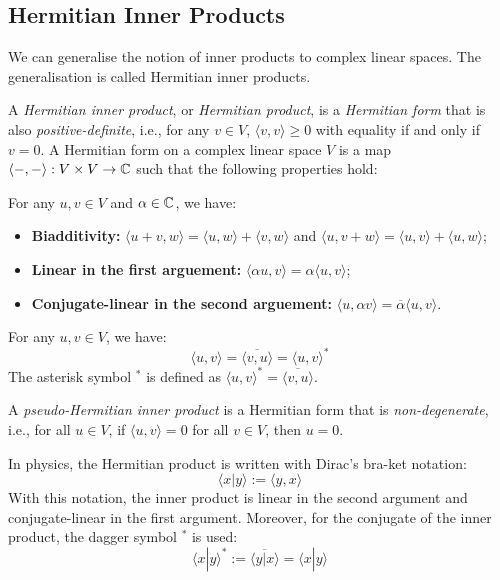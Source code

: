 \subsection{Hermitian Inner Products}
We can generalise the notion of inner products to complex linear spaces. The generalisation is called Hermitian inner products.
\begin{definition}\label{def:hermitian_inner_product}
	A \emph{Hermitian inner product}, or \emph{Hermitian product}, is a \emph{Hermitian form} that is also \emph{positive-definite}, i.e., for any $v \in V$, $\langle v, v \rangle \geq 0$ with equality if and only if $v = 0$. A Hermitian form on a complex linear space $V$ is a map $\langle -, - \rangle : V \times V \to \operatorname{\mathbb{C}}$ such that the following properties hold:
	\begin{description}[labelwidth=\widthof{\bfseries Conjugate Symmetry:~}]
		\item[Sesquilinearity] For any $u, v \in V$ and $\alpha \in \operatorname{\mathbb{C}}$, we have:
		      \begin{itemize}[label={}, leftmargin=0pt]
			      \item \textbf{Biadditivity:} $\langle u + v, w \rangle = \langle u, w \rangle + \langle v, w \rangle$ and $\langle u, v + w \rangle = \langle u, v \rangle + \langle u, w \rangle$;
			      \item \textbf{Linear in the first arguement:} $\langle \alpha u, v \rangle = \alpha \langle u, v \rangle$;
			      \item \textbf{Conjugate-linear in the second arguement:} $\langle u, \alpha v \rangle = \overline{\alpha} \langle u, v \rangle$.
		      \end{itemize}
		\item[Conjugate Symmetry] For any $u, v \in V$, we have:
		      \[
			      \langle u, v \rangle = \overline{\langle v, u \rangle} = \langle u, v \rangle^*
		      \]
		      The asterisk symbol $^*$ is defined as $\langle u, v \rangle^* = \overline{\langle v, u \rangle}$.
	\end{description}
	A \emph{pseudo-Hermitian inner product} is a Hermitian form that is \emph{non-degenerate}, i.e., for all $u \in V$, if $\langle u, v \rangle = 0$ for all $v \in V$, then $u = 0$.
\end{definition}

\begin{remark}
	In physics, the Hermitian product is written with Dirac's bra-ket notation:
	\[
		\langle x | y \rangle := \langle y, x \rangle
	\]
	With this notation, the inner product is linear in the second argument and conjugate-linear in the first argument. Moreover, for the conjugate of the inner product, the dagger symbol $^*$ is used:
	\[
		\langle x | y \rangle^* := \overline{\langle y | x \rangle} = \langle x | y \rangle
	\]
\end{remark}

